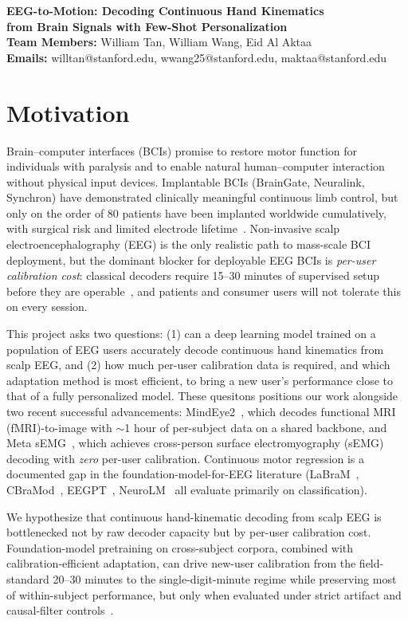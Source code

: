 \documentclass{article}
\makeatletter
\renewcommand{\maketitle}{
  \begin{center}
    \vspace{0.1cm}
    {\bf \large EEG-to-Motion: Decoding Continuous Hand Kinematics\\from Brain Signals with Few-Shot Personalization}\\
    {\bf Team Members:} William Tan, William Wang, Eid Al Aktaa\\
    \vspace{0.1cm}
    {\bf Emails:} willtan@stanford.edu, wwang25@stanford.edu, maktaa@stanford.edu
    \vspace{0.2cm}
  \end{center}
}
\makeatother
\begin{document}
\maketitle

\section{Motivation}

Brain--computer interfaces (BCIs) promise to restore motor function for individuals with paralysis and to enable natural human--computer interaction without physical input devices. Implantable BCIs (BrainGate, Neuralink, Synchron) have demonstrated clinically meaningful continuous limb control, but only on the order of 80 patients have been implanted worldwide cumulatively, with surgical risk and limited electrode lifetime~\cite{dohle2025}. Non-invasive scalp electroencephalography (EEG) is the only realistic path to mass-scale BCI deployment, but the dominant blocker for deployable EEG BCIs is \emph{per-user calibration cost}: classical decoders require 15--30 minutes of supervised setup before they are operable~\cite{lotte2015}, and patients and consumer users will not tolerate this on every session.

This project asks two questions: (1) can a deep learning model trained on a population of EEG users accurately decode continuous hand kinematics from scalp EEG, and (2) how much per-user calibration data is required, and which adaptation method is most efficient, to bring a new user's performance close to that of a fully personalized model. These quesitons positions our work alongside two recent successful advancements: MindEye2~\cite{mindeye2}, which decodes functional MRI (fMRI)-to-image with $\sim$1 hour of per-subject data on a shared backbone, and Meta sEMG~\cite{metaemg}, which achieves cross-person surface electromyography (sEMG) decoding with \emph{zero} per-user calibration. Continuous motor regression is a documented gap in the foundation-model-for-EEG literature (LaBraM~\cite{labram}, CBraMod~\cite{cbramod}, EEGPT~\cite{eegpt}, NeuroLM~\cite{neurolm} all evaluate primarily on classification).

We hypothesize that continuous hand-kinematic decoding from scalp EEG is bottlenecked not by raw decoder capacity but by per-user calibration cost. Foundation-model pretraining on cross-subject corpora, combined with calibration-efficient adaptation, can drive new-user calibration from the field-standard 20--30 minutes to the single-digit-minute regime while preserving most of within-subject performance, but only when evaluated under strict artifact and causal-filter controls~\cite{antelis2013}.
\end{document}
